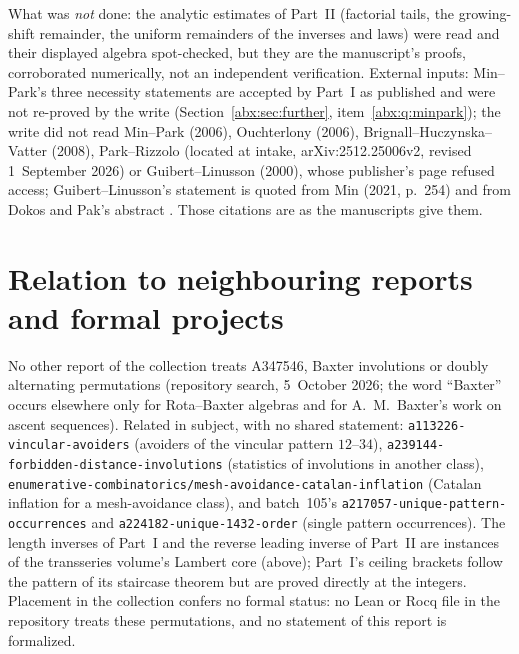 \documentclass[11pt,letterpaper]{article}
\numberwithin{equation}{section}
\theoremstyle{remark}\newtheorem{remark}[theorem]{Remark}
\newcommand{\file}[1]{\nolinkurl{#1}}
\begin{document}
What was \emph{not} done: the analytic estimates of Part~II (factorial tails, the growing-shift remainder, the uniform remainders of the inverses and laws) were read and their displayed algebra spot-checked, but they are the manuscript's proofs, corroborated numerically, not an independent verification. External inputs: Min--Park's three necessity statements are accepted by Part~I as published and were not re-proved by the write (Section~\ref{abx:sec:further}, item~\ref{abx:q:minpark}); the write did not read Min--Park (2006), Ouchterlony (2006), Brignall--Huczynska--Vatter (2008), Park--Rizzolo (located at intake, arXiv:2512.25006v2, revised 1~September 2026) or Guibert--Linusson (2000), whose publisher's page refused access; Guibert--Linusson's statement is quoted from Min (2021, p.~254) and from Dokos and Pak's abstract \cite{DP}. Those citations are as the manuscripts give them.

\section*{Relation to neighbouring reports and formal projects}\label{abx:sec:neighbours}
No other report of the collection treats A347546, Baxter involutions or doubly alternating permutations (repository search, 5~October 2026; the word ``Baxter'' occurs elsewhere only for Rota--Baxter algebras and for A.~M.~Baxter's work on ascent sequences). Related in subject, with no shared statement: \file{a113226-vincular-avoiders} (avoiders of the vincular pattern $12$--$34$), \file{a239144-forbidden-distance-involutions} (statistics of involutions in another class), \file{enumerative-combinatorics/mesh-avoidance-catalan-inflation} (Catalan inflation for a mesh-avoidance class), and batch~105's \file{a217057-unique-pattern-occurrences} and \file{a224182-unique-1432-order} (single pattern occurrences). The length inverses of Part~I and the reverse leading inverse of Part~II are instances of the transseries volume's Lambert core (above); Part~I's ceiling brackets follow the pattern of its staircase theorem but are proved directly at the integers. Placement in the collection confers no formal status: no Lean or Rocq file in the repository treats these permutations, and no statement of this report is formalized.
\clearpage
\end{document}
